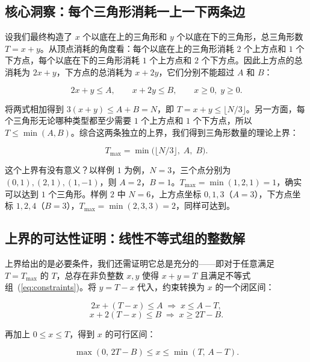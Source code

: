 \subsection{核心洞察：每个三角形消耗一上一下两条边}

设我们最终构造了 $x$ 个以底在上的三角形和 $y$ 个以底在下的三角形，总三角形数 $T = x + y$。从顶点消耗的角度看：每个以底在上的三角形消耗 $2$ 个上方点和 $1$ 个下方点，每个以底在下的三角形消耗 $1$ 个上方点和 $2$ 个下方点。因此上方点的总消耗为 $2x + y$，下方点的总消耗为 $x + 2y$，它们分别不能超过 $A$ 和 $B$：

\begin{equation}\label{eq:constraints}
2x + y \le A, \qquad x + 2y \le B, \qquad x \ge 0,\; y \ge 0.
\end{equation}

将两式相加得到 $3(x + y) \le A + B = N$，即 $T = x + y \le \lfloor N/3 \rfloor$。另一方面，每个三角形无论哪种类型都至少需要 $1$ 个上方点和 $1$ 个下方点，所以 $T \le \min(A, B)$。综合这两条独立的上界，我们得到三角形数量的理论上界：

\begin{equation}\label{eq:maxT}
T_{\max} = \min\!\big(\lfloor N/3 \rfloor,\; A,\; B\big).
\end{equation}

这个上界有没有意义？以样例 $1$ 为例，$N = 3$，三个点分别为 $(0, 1), (2, 1), (1, -1)$，则 $A = 2$，$B = 1$。$T_{\max} = \min(1, 2, 1) = 1$，确实可以达到 $1$ 个三角形。样例 $2$ 中 $N = 6$，上方点坐标 $0, 1, 3$（$A = 3$），下方点坐标 $1, 2, 4$（$B = 3$），$T_{\max} = \min(2, 3, 3) = 2$，同样可达到。

\subsection{上界的可达性证明：线性不等式组的整数解}

上界给出的是必要条件，我们还需证明它总是充分的——即对于任意满足 $T = T_{\max}$ 的 $T$，总存在非负整数 $x, y$ 使得 $x + y = T$ 且满足不等式组~(\ref{eq:constraints})。将 $y = T - x$ 代入，约束转换为 $x$ 的一个闭区间：

\[
2x + (T - x) \le A \;\Longrightarrow\; x \le A - T,
\]
\[
x + 2(T - x) \le B \;\Longrightarrow\; x \ge 2T - B.
\]

再加上 $0 \le x \le T$，得到 $x$ 的可行区间：

\begin{equation}\label{eq:xrange}
\max(0,\, 2T - B) \le x \le \min(T,\, A - T).
\end{equation}

